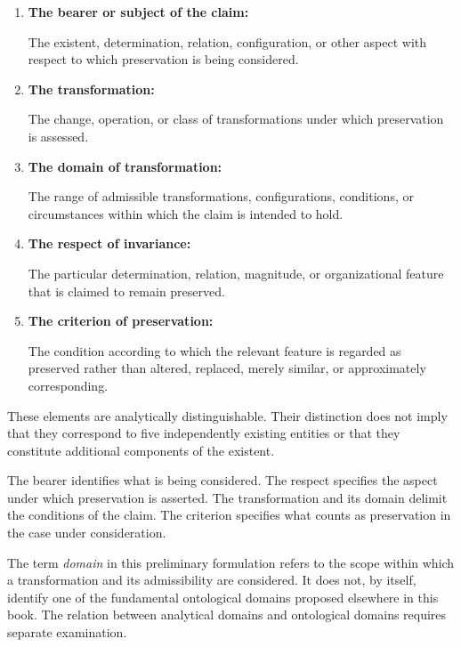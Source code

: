 \begin{enumerate}

    \item \textbf{The bearer or subject of the claim:}

    The existent, determination, relation, configuration,
    or other aspect with respect to which preservation
    is being considered.

    \item \textbf{The transformation:}

    The change, operation, or class of transformations
    under which preservation is assessed.

    \item \textbf{The domain of transformation:}

    The range of admissible transformations, configurations,
    conditions, or circumstances within which the claim
    is intended to hold.

    \item \textbf{The respect of invariance:}

    The particular determination, relation, magnitude,
    or organizational feature that is claimed to remain
    preserved.

    \item \textbf{The criterion of preservation:}

    The condition according to which the relevant feature
    is regarded as preserved rather than altered, replaced,
    merely similar, or approximately corresponding.

\end{enumerate}

These elements are analytically distinguishable. Their
distinction does not imply that they correspond to five
independently existing entities or that they constitute
additional components of the existent.

The bearer identifies what is being considered. The respect
specifies the aspect under which preservation is asserted.
The transformation and its domain delimit the conditions
of the claim. The criterion specifies what counts as
preservation in the case under consideration.

The term \textit{domain} in this preliminary formulation
refers to the scope within which a transformation and
its admissibility are considered. It does not, by itself,
identify one of the fundamental ontological domains
proposed elsewhere in this book. The relation between
analytical domains and ontological domains requires
separate examination.

